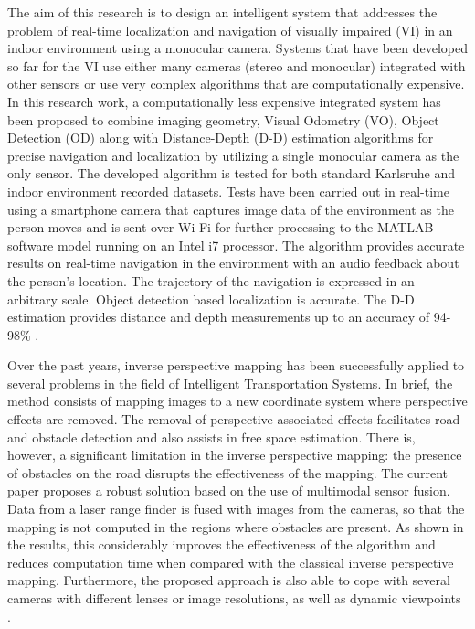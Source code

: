The aim of this research is to design an intelligent system that addresses the problem of real-time localization and navigation of visually impaired (VI) in an indoor environment using a monocular camera. Systems that have been developed so far for the VI use either many cameras (stereo and monocular) integrated with other sensors or use very complex algorithms that are computationally expensive. In this research work, a computationally less expensive integrated system has been proposed to combine imaging geometry, Visual Odometry (VO), Object Detection (OD) along with Distance-Depth (D-D) estimation algorithms for precise navigation and localization by utilizing a single monocular camera as the only sensor. The developed algorithm is tested for both standard Karlsruhe and indoor environment recorded datasets. Tests have been carried out in real-time using a smartphone camera that captures image data of the environment as the person moves and is sent over Wi-Fi for further processing to the MATLAB software model running on an Intel i7 processor. The algorithm provides accurate results on real-time navigation in the environment with an audio feedback about the person's location. The trajectory of the navigation is expressed in an arbitrary scale. Object detection based localization is accurate. The D-D estimation provides distance and depth measurements up to an accuracy of 94-98\% \cite{Ramesh2018}.

Over the past years, inverse perspective mapping has been successfully applied to several problems in the field of Intelligent Transportation Systems. In brief, the method consists of mapping images to a new coordinate system where perspective effects are removed. The removal of perspective associated effects facilitates road and obstacle detection and also assists in free space estimation. There is, however, a significant limitation in the inverse perspective mapping: the presence of obstacles on the road disrupts the effectiveness of the mapping. The current paper proposes a robust solution based on the use of multimodal sensor fusion. Data from a laser range finder is fused with images from the cameras, so that the mapping is not computed in the regions where obstacles are present. As shown in the results, this considerably improves the effectiveness of the algorithm and reduces computation time when compared with the classical inverse perspective mapping. Furthermore, the proposed approach is also able to cope with several cameras with different lenses or image resolutions, as well as dynamic viewpoints \cite{Oliveira2015}.

